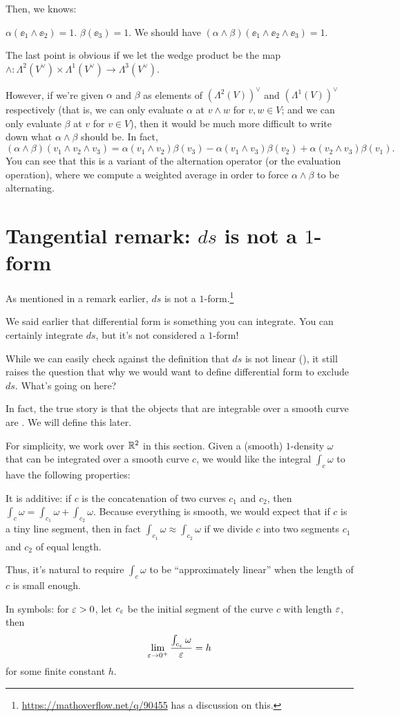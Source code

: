 Then, we knows:
\begin{itemize}
	\ii $\alpha(\ee_1 \wedge \ee_2) = 1$.
	\ii $\beta(\ee_3) = 1$.
	\ii We should have $(\alpha \wedge \beta)(\ee_1 \wedge \ee_2 \wedge \ee_3) = 1$.
\end{itemize}
The last point is obvious if we let the wedge product be the map $\wedge \colon
\Lambda^2(V^\vee) \times \Lambda^1(V^\vee) \to \Lambda^3(V^\vee)$.

However, if we're given $\alpha$ and $\beta$ as elements of $(\Lambda^2(V))^\vee$ and
$(\Lambda^1(V))^\vee$ respectively (that is, we can only evaluate $\alpha$ at $v \wedge w$ for $v, w
\in V$; and we can only evaluate $\beta$ at $v$ for $v \in V$), then it would be much more difficult
to write down what $\alpha \wedge \beta$ should be. In fact,
\[
	(\alpha \wedge \beta)(v_1 \wedge v_2 \wedge v_3) =
	\alpha(v_1 \wedge v_2) \beta(v_3)
	- \alpha(v_1 \wedge v_3) \beta(v_2)
	+ \alpha(v_2 \wedge v_3) \beta(v_1).
\]
You can see that this is a variant of the alternation operator (or the evaluation operation),
where we compute a weighted average in order to force $\alpha \wedge \beta$ to be alternating.

\section{Tangential remark: $ds$ is not a $1$-form}

As mentioned in a remark earlier, $ds$ is not a
$1$-form.\footnote{\url{https://mathoverflow.net/q/90455} has a discussion on this.}

We said earlier that differential form is something you can integrate. You can certainly integrate
$ds$, but it's not considered a $1$-form!

While we can easily check against the definition that $ds$ is not linear
(), it still raises the question that why we would want to
define differential form to exclude $ds$.
What's going on here?

In fact, the true story is that the objects that are integrable over a smooth curve are
. We will define this later.

For simplicity, we work over $\mathbb R^2$ in this section.
Given a (smooth) $1$-density $\omega$ that can be integrated over a smooth curve $c$,
we would like the integral $\int_c \omega$ to have the following properties:
\begin{itemize}
	\ii It is additive: if $c$ is the concatenation of two curves $c_1$ and $c_2$, then
	$\int_c \omega = \int_{c_1} \omega + \int_{c_2} \omega$.
	\ii Because everything is smooth, we would expect that if $c$ is a tiny line segment,
	then in fact $\int_{c_1} \omega \approx \int_{c_2} \omega$ if we divide $c$ into two segments
	$c_1$ and $c_2$ of equal length.

	Thus, it's natural to require $\int_c \omega$ to be ``approximately linear'' when the length of
	$c$ is small enough.

	In symbols: for $\varepsilon > 0$, let $c_\varepsilon$ be the initial segment of the curve $c$ with length
	$\varepsilon$, then
	\[ \lim_{\varepsilon \to 0^+} \frac{\int_{c_\varepsilon} \omega}{\varepsilon} = h \]
	for some finite constant $h$.
\end{itemize}

